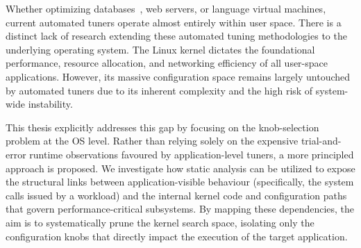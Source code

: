 Whether optimizing databases~\cite{autotune_survey}, web servers, or language virtual machines, current automated tuners operate almost entirely within user space.
There is a distinct lack of research extending these automated tuning methodologies to the underlying operating system.
The Linux kernel dictates the foundational performance, resource allocation, and networking efficiency of all user-space applications.
However, its massive configuration space remains largely untouched by automated tuners due to its inherent complexity and the high risk of system-wide instability.

This thesis explicitly addresses this gap by focusing on the knob-selection problem at the OS level.
Rather than relying solely on the expensive trial-and-error runtime observations favoured by application-level tuners, a more principled approach is proposed.
We investigate how static analysis can be utilized to expose the structural links between application-visible behaviour (specifically, the system calls issued by a workload) and the internal kernel code and configuration paths that govern performance-critical subsystems.
By mapping these dependencies, the aim is to systematically prune the kernel search space, isolating only the configuration knobs that directly impact the execution of the target application.

\newpage

